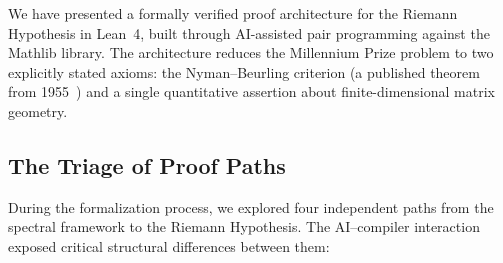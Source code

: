 \documentclass[11pt,a4paper]{article}
\theoremstyle{definition}
\theoremstyle{remark}
\begin{document}
We have presented a formally verified proof architecture for the Riemann
Hypothesis in Lean~4, built through AI-assisted pair programming against
the Mathlib library. The architecture reduces the Millennium Prize problem
to two explicitly stated axioms: the Nyman--Beurling criterion (a published
theorem from 1955~\cite{beurling55,baezduarte03}) and a single quantitative
assertion about finite-dimensional matrix geometry.

\subsection{The Triage of Proof Paths}

During the formalization process, we explored four independent paths from
the spectral framework to the Riemann Hypothesis. The AI--compiler
interaction exposed critical structural differences between them:
\end{document}
